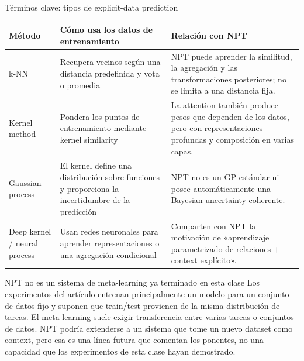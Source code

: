 \documentclass[a4paper]{article}
\begin{document}
\begin{knowledgebox}{Términos clave: tipos de explicit-data prediction}
\begin{tabularx}{\textwidth}{L{0.20\textwidth}L{0.27\textwidth}X}
\toprule
Método & Cómo usa los datos de entrenamiento & Relación con NPT \\
\midrule
k-NN & Recupera vecinos según una distancia predefinida y vota o promedia & NPT puede aprender la similitud, la agregación y las transformaciones posteriores; no se limita a una distancia fija. \\
Kernel method & Pondera los puntos de entrenamiento mediante kernel similarity & La attention también produce pesos que dependen de los datos, pero con representaciones profundas y composición en varias capas. \\
Gaussian process & El kernel define una distribución sobre funciones y proporciona la incertidumbre de la predicción & NPT no es un GP estándar ni posee automáticamente una Bayesian uncertainty coherente. \\
Deep kernel / neural process & Usan redes neuronales para aprender representaciones o una agregación condicional & Comparten con NPT la motivación de «aprendizaje parametrizado de relaciones + context explícito». \\
\bottomrule
\end{tabularx}
\end{knowledgebox}


\begin{warningbox}{NPT no es un sistema de meta-learning ya terminado en esta clase}
Los experimentos del artículo entrenan principalmente un modelo para un conjunto de datos fijo y suponen que train/test provienen de la misma distribución de tareas. El meta-learning suele exigir transferencia entre varias tareas o conjuntos de datos. NPT podría extenderse a un sistema que tome un nuevo dataset como context, pero esa es una línea futura que comentan los ponentes, no una capacidad que los experimentos de esta clase hayan demostrado.
\end{warningbox}

\end{document}
